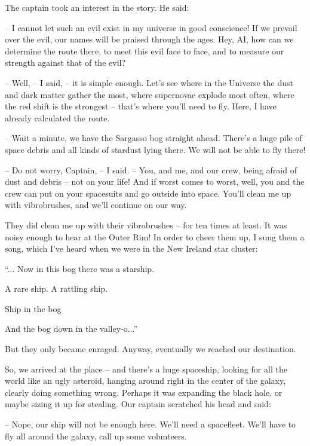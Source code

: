 \documentclass[ebook,oneside,final,openright]{memoir}
\begin{document}
\par
The captain took an interest in the story. He said:\par
– I cannot let such an evil exist in my universe in good conscience! If we prevail over the evil, our names will be praised through the ages. Hey, AI, how can we determine the route there, to meet this evil face to face, and to measure our strength against that of the evil?\par
– Well, – I said, – it is simple enough. Let’s see where in the Universe the dust and dark matter gather the most, where supernovae explode most often, where the red shift is the strongest – that’s where you’ll need to fly. Here, I have already calculated the route.\par
– Wait a minute, we have the Sargasso bog straight ahead. There’s a huge pile of space debris and all kinds of stardust lying there. We will not be able to fly there!\par
– Do not worry, Captain, – I said. – You, and me, and our crew, being afraid of dust and debris – not on your life! And if worst comes to worst, well, you and the crew can put on your spacesuits and go outside into space. You’ll clean me up with vibrobrushes, and we’ll continue on our way.\par
\par
They did clean me up with their vibrobrushes – for ten times at least. It was noisy enough to hear at the Outer Rim! In order to cheer them up, I sung them a song, which I’ve heard when we were in the New Ireland star cluster: \par
“... Now in this bog there was a starship.\par
A rare ship. A rattling ship.\par
Ship in the bog\par
And the bog down in the valley-o...”\par
 But they only became enraged. Anyway, eventually we reached our destination.\par
\par
So, we arrived at the place – and there’s a huge spaceship, looking for all the world like an ugly asteroid, hanging around right in the center of the galaxy, clearly doing something wrong. Perhaps it was expanding the black hole, or maybe sizing it up for stealing. Our captain scratched his head and said:\par
– Nope, our ship will not be enough here. We’ll need a spacefleet. We’ll have to fly all around the galaxy, call up some volunteers.\par
\end{document}

